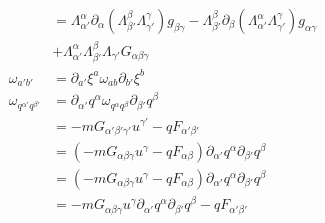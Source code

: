 \documentclass[11pt]{article}
\begin{document}
\begin{equation*}
\begin{aligned}
		&=\Lambda_{\alpha'}^{\alpha}\partial_{\alpha}\left(\Lambda_{\beta'}^{\beta}\Lambda_{\gamma'}^{\gamma}\right)g_{\beta\gamma} -\Lambda_{\beta'}^{\beta}\partial_{\beta}\left(\Lambda_{\alpha'}^{\alpha}\Lambda_{\gamma'}^{\gamma}\right)g_{\alpha\gamma} \\
		&+\Lambda_{\alpha'}^{\alpha}\Lambda_{\beta'}^{\beta}\Lambda_{\gamma'} G_{\alpha\beta\gamma} \\
		\omega_{a'b'} &= \partial_{a'}\xi^a \omega_{ab} \partial_{b'}\xi^b \\
		\omega_{q^{\alpha'}q^{\beta'}} &= \partial_{\alpha'}q^\alpha \omega_{q^{\alpha}q^{\beta}} \partial_{\beta'}q^\beta \\
		&=- m G_{\alpha'\beta'\gamma'} u^{\gamma'} - q F_{\alpha'\beta'} \\
		&= \left(- m G_{\alpha\beta\gamma} u^{\gamma} - q F_{\alpha\beta} \right) \partial_{\alpha'}q^\alpha \partial_{\beta'}q^\beta \\
		&= \left(- m G_{\alpha\beta\gamma} u^{\gamma} - q F_{\alpha\beta} \right) \partial_{\alpha'}q^\alpha \partial_{\beta'}q^\beta \\
		&= - m G_{\alpha\beta\gamma} u^{\gamma} \partial_{\alpha'}q^\alpha \partial_{\beta'}q^\beta - q F_{\alpha'\beta'}  \\
	\end{aligned}
\end{equation*}



\begin{thebibliography}{0}
	
\end{thebibliography}
\end{document}
